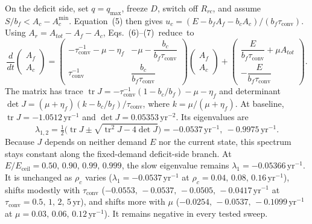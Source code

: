 \documentclass[11pt,a4paper]{article}
\newcommand{\Eceil}{E_{\mathrm{ceil}}}
\newcommand{\Acmin}{A_c^{\min}}
\newcommand{\tconv}{\tau_{\mathrm{conv}}}
\begin{document}
On the deficit side, set $q=q_{\max}$, freeze $D$, switch off $R_{rc}$, and assume $S/b_f<A_c-\Acmin$. Equation~(5) then gives $u_c=(E-b_fA_f-b_cA_c)/(b_f\tconv)$. Using $A_r=A_{tot}-A_f-A_c$, \mbox{Eqs.~(6)--(7) reduce to}
\begin{equation}
\frac{d}{dt}\begin{pmatrix}A_f\\A_c\end{pmatrix}=
\begin{pmatrix}-\tconv^{-1}-\mu-\eta_f & -\mu-\dfrac{b_c}{b_f\tconv}\\[8pt]\tconv^{-1} & \dfrac{b_c}{b_f\tconv}\end{pmatrix}
\begin{pmatrix}A_f\\A_c\end{pmatrix}+
\begin{pmatrix}\dfrac{E}{b_f\tconv}+\mu A_{tot}\\[8pt]-\dfrac{E}{b_f\tconv}\end{pmatrix}.
\end{equation}
The matrix has trace $\operatorname{tr}J=-\tconv^{-1}(1-b_c/b_f)-\mu-\eta_f$ and determinant $\det J=(\mu+\eta_f)(k-b_c/b_f)/\tconv$, where $k=\mu/(\mu+\eta_f)$. At baseline, $\operatorname{tr}J=-1.0512\,\mathrm{yr}^{-1}$ and $\det J=0.05353\,\mathrm{yr}^{-2}$. Its eigenvalues are
\begin{equation}
\lambda_{1,2}=\tfrac12\Big(\operatorname{tr}J\pm\sqrt{\operatorname{tr}^2J-4\det J}\Big)=-0.0537\,\mathrm{yr}^{-1},\ -0.9975\,\mathrm{yr}^{-1}.
\end{equation}
Because $J$ depends on neither demand $E$ nor the current state, this spectrum stays constant along the fixed-demand deficit-side branch. At $E/\Eceil=0.50,\,0.90,\,0.99,\,0.999$, the slow eigenvalue remains $\lambda_1=-0.05366\,\mathrm{yr}^{-1}$. It is unchanged as $\rho_c$ varies ($\lambda_1=-0.0537\,\mathrm{yr}^{-1}$ at $\rho_c=0.04,\,0.08,\,0.16\,\mathrm{yr}^{-1}$), shifts modestly with $\tconv$ ($-0.0553,\,-0.0537,\,-0.0505,\,-0.0417\,\mathrm{yr}^{-1}$ at $\tconv=0.5,\,1,\,2,\,5\,\mathrm{yr}$), and shifts more with $\mu$ ($-0.0254,\,-0.0537,\,-0.1099\,\mathrm{yr}^{-1}$ at $\mu=0.03,\,0.06,\,0.12\,\mathrm{yr}^{-1}$). It remains negative in every tested sweep.
\end{document}
